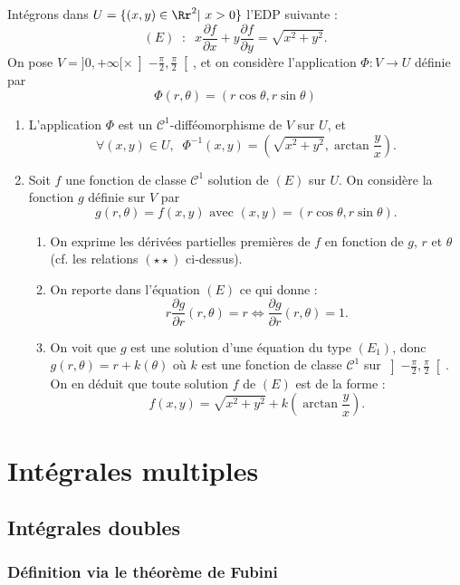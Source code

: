 \documentclass[class=report,crop=false]{standalone}
\begin{document}
Intégrons dans $U=\{(x,y)\in \Rr^2|\ x>0\}$ l'EDP suivante :
$$(E)\;\; :\; \; x\frac{\partial f}{\partial x}+y\frac{\partial f}{\partial y}=\sqrt{x^2+y^2}.$$
\rm On pose $\displaystyle V=]0,+\infty [\times \left]-\frac{\pi}{2},\frac{\pi}{2}\right[$, et on considère l'application $\Phi : V\to U$ définie par
$$\Phi (r,\theta )=(r\cos \theta,r\sin \theta )$$
\begin{enumerate}
\item L'application $\Phi$ est un ${\mathscr C}^1$-difféomorphisme de $V$ sur $U$, et
$$\forall (x,y)\in U,\; \;\Phi ^{-1}(x,y)=\left( \sqrt{x^2+y^2},\arctan\frac{y}{x}\right).$$
\item Soit $f$ une fonction de classe ${\mathscr C}^1$ solution de $(E)$ sur $U$. On considère la fonction $g$ définie sur $V$ par
$$g(r,\theta )=f(x,y)\mbox{ avec }(x,y)=(r\cos \theta,r\sin \theta ).$$
\begin{enumerate}
\item On exprime les dérivées partielles premières de $f$ en fonction de $g$, $r$ et $\theta$ (cf. les relations $(\star \star )$ ci-dessus).
\item On reporte dans l'équation $(E)$ ce qui donne :
$$r\frac{\partial g}{\partial r}(r,\theta )=r\Leftrightarrow \frac{\partial g}{\partial r}(r,\theta )=1.$$
\item On voit que $g$ est une solution d'une équation du type $(E_1)$, donc $g(r,\theta )=r+k(\theta )$ o\`u $k$ est une fonction de classe ${\mathscr C}^1$ sur $\displaystyle \left]-\frac{\pi}{2},\frac{\pi}{2}\right[$. On en déduit que toute solution $f$ de $(E)$ est de la forme :
$$\displaystyle f(x,y)=\sqrt{x^2+y^2}+k\left(\arctan \frac{y}{x}\right).$$
\end{enumerate}                 
\end{enumerate}

\vskip6mm


\chapter{\bf Intégrales multiples}
\section{\bf Intégrales doubles}
\subsection{Définition via le théorème de Fubini}
\end{document}
